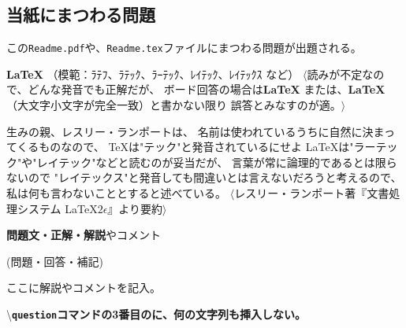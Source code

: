 \documentclass[titlepage,10pt,a4j]{ltjsarticle} %
\begin{document}
    \clearpage
    \subsection{当紙にまつわる問題}
    この\texttt{Readme.pdf}や、\texttt{Readme.tex}ファイルにまつわる問題が出題される。

            {
                \textbf{\LaTeX}\newline
                \footnotesize{（模範：ﾗﾃﾌ、ﾗﾃｯｸ、ﾗｰﾃｯｸ、ﾚｲﾃｯｸ、ﾚｲﾃｯｸｽ など）\newline
                \ensuremath{\langle}読みが不定なので、どんな発音でも正解だが、
                ボード回答の場合は\textbf{\LaTeX} または、\textbf{LaTeX}（大文字小文字が完全一致）と書かない限り
                誤答とみなすのが適。\ensuremath{\rangle}}        
            }        
            {
                生みの親、レスリー・ランポートは、
                名前は使われているうちに自然に決まってくるものなので、
                \TeX は"テック"と発音されているにせよ
                \LaTeX は"ラーテック"や"レイテック"などと読むのが妥当だが、
                言葉が常に論理的であるとは限らないので
                "レイテックス"と発音しても間違いとは言えないだろうと考えるので、
                私は何も言わないこととすると述べている。
                \ensuremath{\langle}レスリー・ランポート著『文書処理システム \LaTeX $2\epsilon$』より要約\ensuremath{\rangle}
                
            }
            {
                \textbf{問題文・正解・解説}やコメント
                
                \footnotesize{(問題・回答・補記)}
            }
            {
                ここに解説やコメントを記入。
            }

            {
                \textbackslash\textbf{\texttt{question}コマンドの3番目のに、何の文字列も挿入しない。}
            }
            {
            } 
\end{document}
